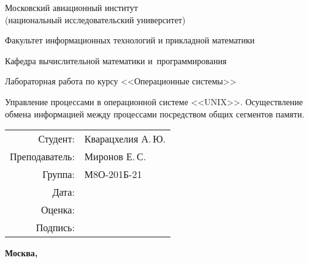 \begin{titlepage}
	\begin{center}
		\bfseries
		
		{\Large Московский авиационный институт\\ (национальный исследовательский университет)}
		
		\vspace{48pt}
		
		{\large Факультет информационных технологий и прикладной математики}
		
		\vspace{36pt}
		
		{\large Кафедра вычислительной математики и~программирования}
		
		\vspace{48pt}
		
		Лабораторная работа  по курсу <<Операционные системы>>
		
		\vspace{48pt}
		
		Управление процессами в операционной системе <<UNIX>>. Осуществление обмена информацией между процессами посредством общих сегментов памяти.
		
	\end{center}
	
	\vspace{150pt}
	
	\begin{flushright}
		\begin{tabular}{rl}
			Студент: & Кварацхелия А.\,Ю. \\
			Преподаватель: & Миронов Е.\,С. \\
			Группа: & М8О-201Б-21 \\
			Дата: & \\
			Оценка: & \\
			Подпись: & \\
		\end{tabular}
	\end{flushright}
	
	\vfill
	
	\begin{center}
		\bfseries
		Москва, \the\year
	\end{center}
\end{titlepage}